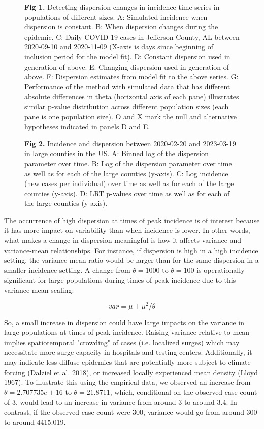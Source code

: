 \documentclass[10pt,letterpaper]{article}
\begin{document}
\begin{figure}[!h]
\caption{{\bf Fig 1.}
Detecting dispersion changes in incidence time series in populations of different sizes. A: Simulated incidence when dispersion is constant. B: When dispersion changes during the epidemic. C: Daily COVID-19 cases in Jefferson County, AL between 2020-09-10 and 2020-11-09 (X-axis is days since beginning of inclusion period for the model fit). D: Constant dispersion used in generation of above. E: Changing dispersion used in generation of above. F: Dispersion estimates from model fit to the above series. G: Performance of the method with simulated data that has different absolute differences in theta (horizontal axis of each pane) illustrates similar p-value distribution across different population sizes (each pane is one population size). O and X mark the null and alternative hypotheses indicated in panels D and E. 
 }
\label{fig1}
\end{figure}

\begin{figure}[!h]
\caption{{\bf Fig 2.}
Incidence and dispersion between 2020-02-20 and 2023-03-19 in large counties in the US. A: Binned log of the dispersion parameter over time. B: Log of the dispersion parameter over time as well as for each of the large counties (y-axis). C: Log incidence (new cases per individual) over time as well as for each of the large counties (y-axis). D: LRT p-values over time as well as for each of the large counties (y-axis).
}
\label{fig2}
\end{figure}

The occurrence of high dispersion at times of peak incidence is of interest because it has more impact on variability than when incidence is lower. In other words, what makes a change in dispersion meaningful is how it affects variance and variance-mean relationships. For instance, if dispersion is high in a high incidence setting, the variance-mean ratio would be larger than for the same dispersion in a smaller incidence setting. A change from $\theta = 1000$ to $\theta = 100$ is operationally significant for large populations during times of peak incidence due to this variance-mean scaling:

$$var = \mu + \mu^2/\theta$$

So, a small increase in dispersion could have large impacts on the variance in large populations at times of peak incidence. Raising variance relative to mean implies spatiotemporal "crowding" of cases (i.e. localized surges) which may necessitate more surge capacity in hospitals and testing centers. Additionally, it may indicate less diffuse epidemics that are potentially more subject to climate forcing (Dalziel et al. 2018), or increased locally experienced mean density (Lloyd 1967). To illustrate this using the empirical data, we observed an increase from $\theta = 2.707735e+16$ to $\theta = 21.8711$, which, conditional on the observed case count of 3, would lead to an increase in variance from around 3 to around 3.4. In contrast, if the observed case count were 300, variance would go from around 300 to around 4415.019.
\end{document}
